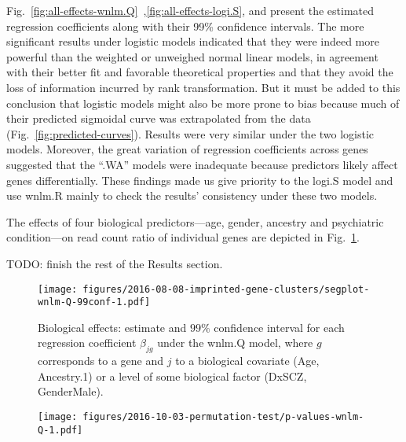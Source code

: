 \documentclass[letterpaper]{article}
\begin{document}
Fig.~\ref{fig:all-effects-wnlm.Q}~,\ref{fig:all-effects-logi.S},
and present the estimated regression coefficients
along with their 99\% confidence intervals.  The
more significant results under logistic models indicated that they were indeed
more powerful than the weighted or unweighed normal linear models, in
agreement with their better fit and favorable theoretical properties and that
they avoid the loss of information incurred by rank transformation.  But it
must be added to this conclusion that logistic models might also be more prone
to bias because much of their predicted sigmoidal curve was extrapolated from
the data (Fig.~\ref{fig:predicted-curves}).  Results were very similar under
the two logistic models.  Moreover, the great variation of regression
coefficients across genes suggested that the ``.WA'' models were inadequate
because predictors likely affect genes differentially.  These findings made us
give priority to the logi.S model and use wnlm.R mainly to check the results'
consistency under these two models.

The effects of four biological predictors---age, gender, ancestry and
psychiatric condition---on read count ratio of individual genes are depicted
in Fig.~\ref{fig:biol-effects-wnlm.Q}.

TODO: finish the rest of the Results section.

\begin{figure}
\begin{center}
\texttt{[image: figures/2016-08-08-imprinted-gene-clusters/segplot-wnlm-Q-99conf-1.pdf]}
\end{center}
\caption{Biological effects: estimate and $99\%$ confidence interval for each
regression coefficient \(\beta_{jg}\) under the wnlm.Q model, where \(g\)
corresponds to a gene and \(j\) to a biological covariate (Age, Ancestry.1) or
a level of some biological factor (DxSCZ, GenderMale).}
\label{fig:biol-effects-wnlm.Q}
\end{figure}

\begin{figure}
\begin{center}
\texttt{[image: figures/2016-10-03-permutation-test/p-values-wnlm-Q-1.pdf]}
\end{center}
\caption{}
\label{fig:pval-wnlm.Q}
\end{figure}

\begin{table}
\footnotesize

\label{tab:signif-gene-effects}
\end{table}
\end{document}
